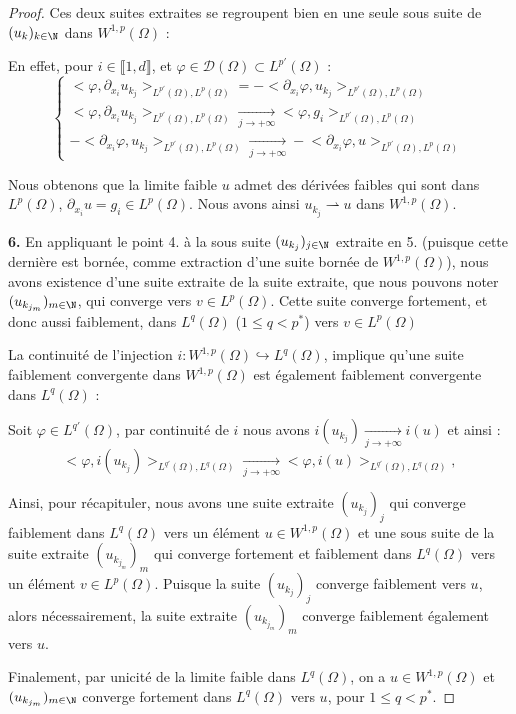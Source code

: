 \begin{proof}
    Ces deux suites extraites se regroupent bien en une seule sous suite de $(u_{k})_{k\in \N}$ dans $W^{1,p}(\Omega)$ :

    En effet, pour $i \in \llbracket 1,d \rrbracket$, et $\varphi \in \mathcal{D}(\Omega) \subset L^{p'}(\Omega)$ :
    $$\begin{cases}
        \big< \varphi, \partial_{x_i} u_{k_j} \big>_{L^{p'}(\Omega),L^p(\Omega)} = - \big<\partial_{x_i}\varphi, u_{k_j} \big>_{L^{p'}(\Omega),L^p(\Omega)} \\
        \big<\varphi, \partial_{x_i} u_{k_j} \big>_{L^{p'}(\Omega),L^p(\Omega)} \xrightarrow[j \to +\infty]{}  \big<\varphi, g_i \big>_{L^{p'}(\Omega),L^p(\Omega)} \\
        - \big<\partial_{x_i}\varphi, u_{k_j} \big>_{L^{p'}(\Omega),L^p(\Omega)} \xrightarrow[j \to +\infty]{} - \big<\partial_{x_i}\varphi,u \big>_{L^{p'}(\Omega),L^p(\Omega)}
    \end{cases}$$

    Nous obtenons que la limite faible $u$ admet des dérivées faibles qui sont dans $L^p(\Omega)$, $\partial_{x_i}u = g_i \in L^p(\Omega)$.
    Nous avons ainsi $u_{k_j} \rightharpoonup u$ dans $W^{1,p}(\Omega)$.

    \vspace{1em}

    \textbf{6.}
    En appliquant le point 4. à la sous suite $(u_{k_j})_{j \in \N}$ extraite en 5. (puisque cette dernière est bornée, comme extraction d'une suite bornée de $W^{1,p}(\Omega)$), nous avons existence d'une suite extraite de la suite extraite, que nous pouvons noter $(u_{k_{j_m}})_{m\in \N}$, qui converge vers $v \in L^p(\Omega)$. 
    Cette suite converge fortement, et donc aussi faiblement, dans $L^q(\Omega)$ ($1 \leq q < p^*$) vers $v \in L^p(\Omega)$

    La continuité de l'injection $i : W^{1,p}(\Omega) \hookrightarrow L^q(\Omega)$, implique qu'une suite faiblement convergente dans $W^{1,p}(\Omega)$ est également faiblement convergente dans $L^q(\Omega)$ :
    
    Soit $\varphi \in L^{q'}(\Omega)$, par continuité de $i$ nous avons $i(u_{k_j}) \xrightarrow[j \to +\infty]{} i(u)$ et ainsi :
    $$ \big< \varphi , i(u_{k_j}) \big>_{L^{q'}(\Omega),L^q(\Omega)} \xrightarrow[j \to +\infty]{} \big<\varphi, i(u) \big>_{L^{q'}(\Omega),L^q(\Omega)}, $$


    \vspace{1em}
    Ainsi, pour récapituler, nous avons une suite extraite $(u_{k_j})_j$ qui converge faiblement dans $L^q(\Omega)$ vers un élément $u \in W^{1,p}(\Omega)$ et une sous suite de la suite extraite $(u_{k_{j_m}})_m$ qui converge fortement et faiblement dans $L^q(\Omega)$ vers un élément $v \in L^p(\Omega)$.
    Puisque la suite $(u_{k_j})_j$ converge faiblement vers $u$, alors nécessairement, la suite extraite $(u_{k_{j_m}})_m$ converge faiblement également vers $u$.
    
    Finalement, par unicité de la limite faible dans $L^q(\Omega)$, on a $u \in W^{1,p}(\Omega)$ et $(u_{k_{j_m}})_{m\in \N}$ converge fortement dans $L^q(\Omega)$ vers $u$, pour $1\leq q < p^*$.

\end{proof}

